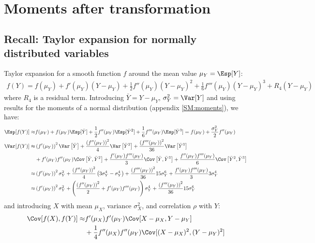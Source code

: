 \documentclass[12pt]{article}
\begin{document}
\section{Moments after transformation}
\label{sec:org4e2e621}
\subsection{Recall: Taylor expansion for normally distributed variables}
\label{sec:org0f6fc4c}

Taylor expansion for a smooth function \(f\) around the mean value \(\mu_Y=\Esp[Y]\):
\begin{align*}
f(Y) = f(\mu_Y) + f'(\mu_Y) (Y-\mu_Y) + \frac{1}{2} f''(\mu_Y) (Y-\mu_Y)^2  + \frac{1}{6} f'''(\mu_Y) (Y-\mu_Y)^3 + R_4(Y-\mu_Y)
\end{align*}
where \(R_4\) is a residual term. Introducing \(\bar{Y}=Y-\mu_Y\),
\(\sigma_Y^2 = \Var[Y]\) and using results for the moments of a normal
distribution (appendix \ref{SM:moments}), we have:
\begin{align*}
\Esp[f(Y)] \approx& f(\mu_Y) + f(\mu_Y) \Esp[\bar{Y}]  + \frac{1}{2} f''(\mu_Y) \Esp[\bar{Y}^2] + \frac{1}{6} f'''(\mu_Y) \Esp[\bar{Y}^3] 
= f(\mu_Y) + \frac{\sigma_Y^2}{2} f''(\mu_Y) \\
\Var[f(Y)] \approx& \left(f'(\mu_Y)\right)^2 \Var\left[\bar{Y}\right] + \frac{\left(f''(\mu_Y)\right)^2}{4} \Var\left[\bar{Y}^2\right]  + \frac{\left(f'''(\mu_Y)\right)^2}{36} \Var\left[\bar{Y}^3\right] \\
& +f'(\mu_Y) f''(\mu_Y)\Cov\left[\bar{Y},\bar{Y}^2\right] + \frac{f'(\mu_Y) f'''(\mu_Y)}{3} \Cov\left[\bar{Y},\bar{Y}^3\right] +\frac{f''(\mu_Y) f'''(\mu_Y)}{6}\Cov\left[\bar{Y}^2,\bar{Y}^3\right]\\
\approx& \left(f'(\mu_Y)\right)^2 \sigma_Y^2 + \frac{\left(f''(\mu_Y)\right)^2}{4} \left(3 \sigma_Y^4 - \sigma_Y^4\right)  + \frac{\left(f'''(\mu_Y)\right)^2}{36}  15 \sigma_Y^6
 + \frac{f'(\mu_Y) f'''(\mu_Y)}{3} 3 \sigma_Y^4 \\
\approx& \left(f'(\mu_Y)\right)^2 \sigma_Y^2 + \left(\frac{\left(f''(\mu_Y)\right)^2}{2} + f'(\mu_Y)f'''(\mu_Y)\right) \sigma_Y^4 + \frac{\left(f'''(\mu_Y)\right)^2}{36}  15 \sigma_Y^6 
\end{align*}
and introducing \(X\) with mean \(\mu_X\), variance \(\sigma_X^2\), and correlation \(\rho\) with \(Y\):
\begin{align*}
\Cov[f(X),f(Y)] \approx& f'(\mu_X) f'(\mu_Y) \Cov[X-\mu_X,Y-\mu_Y] \\ &+ \frac{1}{4} f''(\mu_X) f''(\mu_Y) \Cov[(X-\mu_X)^2,(Y-\mu_Y)^2]
\end{align*}
\end{document}
